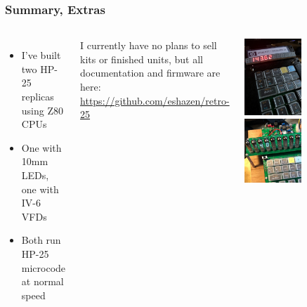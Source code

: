 \documentclass{beamer}
\begin{document}
\begin{frame}
  \frametitle{Summary, Extras}

  \begin{columns}
    \begin{itemize}
    \scriptsize
    \item I've built two HP-25 replicas using Z80 CPUs
    \item One with 10mm LEDs, one with IV-6 VFDs
    \item Both run HP-25 microcode at normal speed
    \end{itemize}
    \vskip 0.2in
    \scriptsize
    I currently have no plans to sell kits or finished
    units, but all documentation and firmware are here:
    \url{https://github.com/eshazen/retro-25}

    \includegraphics[width=0.5\textwidth]{figs/led-close.jpg}
    \vskip 0.2in
    \includegraphics[width=0.5\textwidth]{figs/vfd-zoom.jpg}
  \end{columns}
\end{frame}
\end{document}
